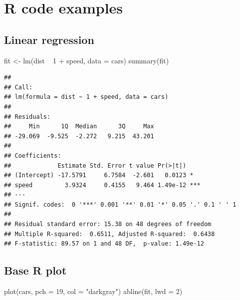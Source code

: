 \documentclass[]{book}
\newenvironment{Shaded}{}{}
\newcommand{\DataTypeTok}[1]{#1}
\newcommand{\DecValTok}[1]{#1}
\newcommand{\KeywordTok}[1]{\textcolor[rgb]{0.00,0.00,1.00}{#1}}
\newcommand{\NormalTok}[1]{#1}
\newcommand{\OperatorTok}[1]{#1}
\newcommand{\StringTok}[1]{\textcolor[rgb]{0.00,0.50,0.50}{#1}}
\begin{document}
\hypertarget{r-code-examples}{%
\section{R code examples}\label{r-code-examples}}

\hypertarget{linear-regression}{%
\subsection{Linear regression}\label{linear-regression}}

\begin{Shaded}
\begin{Highlighting}[]
\NormalTok{fit <-}\StringTok{ }\KeywordTok{lm}\NormalTok{(dist }\OperatorTok{~}\StringTok{ }\DecValTok{1} \OperatorTok{+}\StringTok{ }\NormalTok{speed, }\DataTypeTok{data =}\NormalTok{ cars)}
\KeywordTok{summary}\NormalTok{(fit)}
\end{Highlighting}
\end{Shaded}

\begin{verbatim}
## 
## Call:
## lm(formula = dist ~ 1 + speed, data = cars)
## 
## Residuals:
##     Min      1Q  Median      3Q     Max 
## -29.069  -9.525  -2.272   9.215  43.201 
## 
## Coefficients:
##             Estimate Std. Error t value Pr(>|t|)    
## (Intercept) -17.5791     6.7584  -2.601   0.0123 *  
## speed         3.9324     0.4155   9.464 1.49e-12 ***
## ---
## Signif. codes:  0 '***' 0.001 '**' 0.01 '*' 0.05 '.' 0.1 ' ' 1
## 
## Residual standard error: 15.38 on 48 degrees of freedom
## Multiple R-squared:  0.6511, Adjusted R-squared:  0.6438 
## F-statistic: 89.57 on 1 and 48 DF,  p-value: 1.49e-12
\end{verbatim}

\hypertarget{base-r-plot}{%
\subsection{Base R plot}\label{base-r-plot}}

\begin{Shaded}
\begin{Highlighting}[]
\KeywordTok{plot}\NormalTok{(cars, }\DataTypeTok{pch =} \DecValTok{19}\NormalTok{, }\DataTypeTok{col =} \StringTok{"darkgray"}\NormalTok{)}
\KeywordTok{abline}\NormalTok{(fit, }\DataTypeTok{lwd =} \DecValTok{2}\NormalTok{)}
\end{Highlighting}
\end{Shaded}
\end{document}
